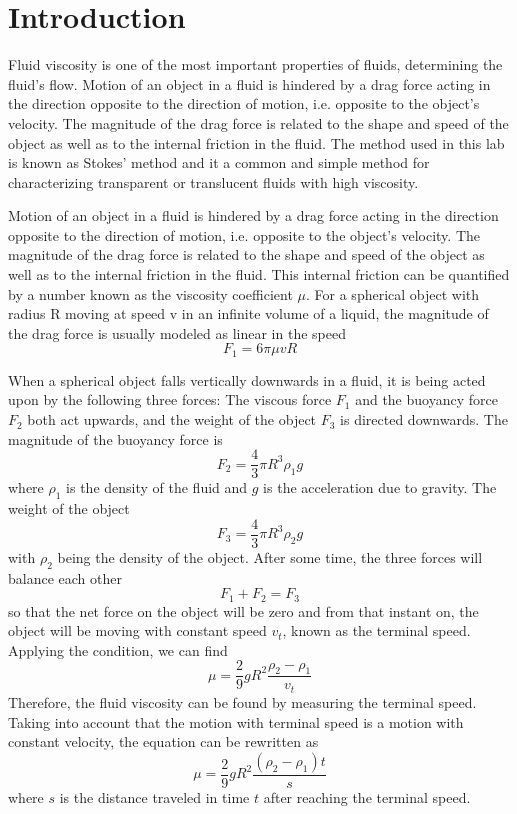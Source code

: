 \section{Introduction}
Fluid viscosity is one of the most important properties of fluids, determining
the fluid’s flow. 
Motion of an object in a fluid is hindered by a drag force acting in the
direction opposite to the direction of motion, i.e. opposite to the object’s
velocity. 
The magnitude of the drag force is related to the shape and speed of the object
as well as to the internal friction in the fluid.
The method used in this lab is known as Stokes’ method and it a common and
simple method for characterizing transparent or translucent fluids with high
viscosity.


Motion of an object in a fluid is hindered by a drag force acting in the
direction opposite to the direction of motion, i.e. opposite to the object’s
velocity. 
The magnitude of the drag force is related to the shape and speed of the object
as well as to the internal friction in the fluid.
This internal friction can be quantified by a number known as the viscosity
coefficient $\mu$.
For a spherical object with radius R moving at speed v in an infinite volume of
a liquid, the magnitude of the drag force is usually modeled as linear in the
speed
$$  F_1 = 6 \pi \mu v R  $$

When a spherical object falls vertically downwards in a fluid, it is being acted
upon by the following three forces:
The viscous force \emph{$F_1$} and the buoyancy force \emph{$F_2$} both act
upwards, and the weight of the object \emph{$F_3$} is directed downwards.
The magnitude of the buoyancy force is
$$  F_2 = \frac{4}{3} \pi R^3 \rho_1 g $$
where $\rho_1$ is the density of the fluid and $g$ is the acceleration due to
gravity. The weight of the object
$$  F_3 = \frac{4}{3} \pi R^3 \rho_2 g $$
with $\rho_2$ being the density of the object. After some time, the three forces
will balance each other
$$  F_1 + F_2 = F_3  $$
so that the net force on the object will be zero and from that instant on, the
object will be moving with constant speed $v_t$, known as the terminal speed.
Applying the condition, we can find
$$  \mu = \frac{2}{9} g R^2 \frac{\rho_2 - \rho_1 }{v_t}  $$
Therefore, the fluid viscosity can be found by measuring the terminal speed.
Taking into account that the motion with terminal speed is a motion with
constant velocity, the equation can be rewritten as
$$  \mu = \frac{2}{9} g R^2 \frac{( \rho_2 - \rho_1 ) t  }{s}  $$
where $s$ is the distance traveled in time $t$ after reaching the terminal
speed.

